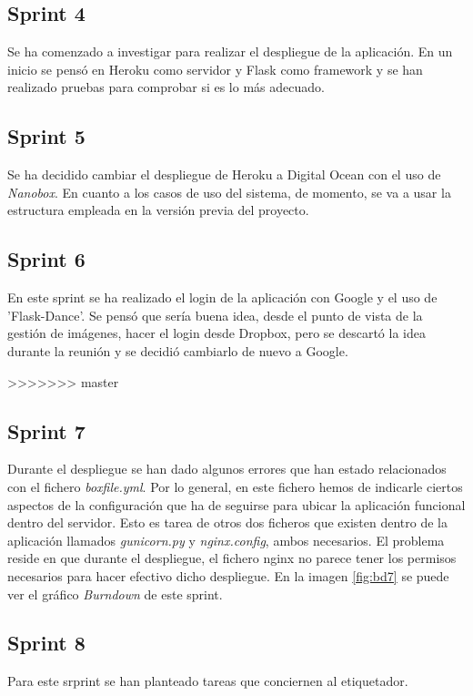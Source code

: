 \subsection{Sprint 4}
Se ha comenzado a investigar para realizar el despliegue de la aplicación. En un inicio se pensó en Heroku como servidor y Flask como framework y se han realizado pruebas para comprobar si es lo más adecuado. 

\subsection{Sprint 5}
Se ha decidido cambiar el despliegue de Heroku a Digital Ocean con el uso de \textit{Nanobox}. En cuanto a los casos de uso del sistema, de momento, se va a usar la estructura empleada en la versión previa del proyecto.

\subsection{Sprint 6}
En este sprint se ha realizado el login de la aplicación con Google y el uso de 'Flask-Dance'. Se pensó que sería buena idea, desde el punto de vista de la gestión de imágenes, hacer el login desde Dropbox, pero se descartó la idea durante la reunión y se decidió cambiarlo de nuevo a Google.


>>>>>>> master
\subsection{Sprint 7}

Durante el despliegue se han dado algunos errores que han estado relacionados con el fichero \textit{boxfile.yml}. Por lo general, en este fichero hemos de indicarle ciertos aspectos de la configuración que ha de seguirse para ubicar la aplicación funcional dentro del servidor. Esto es tarea de otros dos ficheros que existen dentro de la aplicación llamados \textit{gunicorn.py} y \textit{nginx.config}, ambos necesarios. El problema reside en que durante el despliegue, el fichero nginx no parece tener los permisos necesarios para hacer efectivo dicho despliegue. 
En la imagen \ref{fig:bd7} se puede ver el gráfico \textit{Burndown} de este sprint.
\subsection{Sprint 8}

Para este srprint se han planteado tareas que conciernen al etiquetador. 

